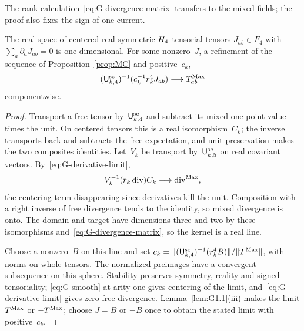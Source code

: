 \begin{samepage}
The rank calculation~\eqref{eq:G-divergence-matrix} transfers to the mixed fields; the proof also fixes the sign of one current.
\begin{lemma}\label{lem:G2.2}
The real space of centered real symmetric $H_4$-tensorial tensors $J_{ab}\in F_4$ with $\sum_a\partial_aJ_{ab}=0$ is one-dimensional. For some nonzero~$J$, a refinement of the sequence of Proposition~\ref{prop:MC} and positive~$c_k$,
\begin{equation*}
(\mathsf{U}_{k,4}^{\mathrm{sc}})^{-1}(c_k^{-1}r_k^4J_{ab})
 \longrightarrow T^{\mathrm{Max}}_{ab}
\end{equation*}
componentwise.
\end{lemma}
\end{samepage}
\begin{proof}
Transport a free tensor by~$\mathsf{U}_{k,4}^{\mathrm{sc}}$ and subtract its mixed one-point value times the unit. On centered tensors this is a real isomorphism~$C_k$; the inverse transports back and subtracts the free expectation, and unit preservation makes the two composites identities. Let~$V_k$ be transport by~$\mathsf{U}_{k,5}^{\mathrm{sc}}$ on real covariant vectors. By~\eqref{eq:G-derivative-limit},
\begin{equation*}
V_k^{-1}(r_k\operatorname{div})C_k
 \longrightarrow\operatorname{div}^{\rm Max},
\end{equation*}
the centering term disappearing since derivatives kill the unit. Composition with a right inverse of free divergence tends to the identity, so mixed divergence is onto. The domain and target have dimensions three and two by these isomorphisms and~\eqref{eq:G-divergence-matrix}, so the kernel is a real line.

Choose a nonzero~$B$ on this line and set $c_k=\|(\mathsf{U}_{k,4}^{\mathrm{sc}})^{-1}(r_k^4B)\|/\|T^{\mathrm{Max}}\|$, with norms on whole tensors. The normalized preimages have a convergent subsequence on this sphere. Stability preserves symmetry, reality and signed tensoriality; \eqref{eq:G-smooth} at arity one gives centering of the limit, and~\eqref{eq:G-derivative-limit} gives zero free divergence. Lemma~\ref{lem:G1.1}(iii) makes the limit $T^{\mathrm{Max}}$ or $-T^{\mathrm{Max}}$; choose $J=B$ or $-B$ once to obtain the stated limit with positive~$c_k$.
\end{proof}

